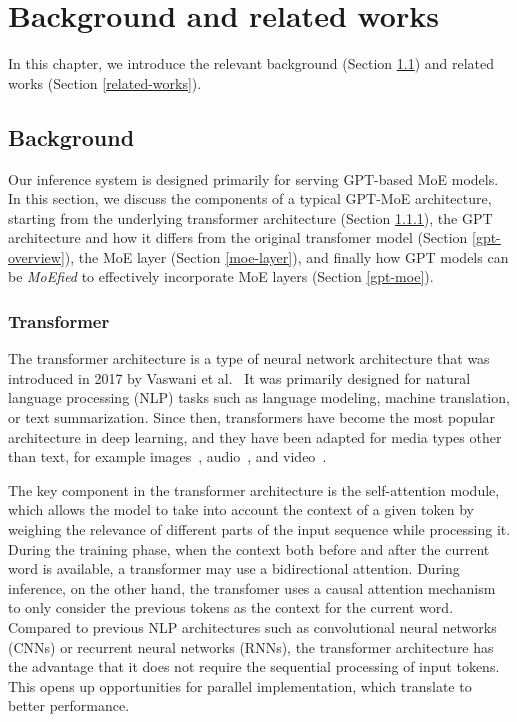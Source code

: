 \chapter{Background and related works}\label{chapter-2}
In this chapter, we introduce the relevant background (Section \ref{background}) and related works (Section \ref{related-works}). 

\section{Background}\label{background}
Our inference system is designed primarily for serving GPT-based MoE models. In this section, we discuss the components of a typical GPT-MoE architecture, starting from the underlying transformer architecture (Section \ref{transformer}), the GPT architecture and how it differs from the original transfomer model (Section \ref{gpt-overview}), the MoE layer (Section \ref{moe-layer}), and finally how GPT models can be \textit{MoEfied} to effectively incorporate MoE layers (Section \ref{gpt-moe}).

\subsection{Transformer}\label{transformer}
The transformer architecture is a type of neural network architecture that was introduced in 2017 by Vaswani et al.~\cite{transformer} It was primarily designed for natural language processing (NLP) tasks such as language modeling, machine translation, or text summarization. Since then, transformers have become the most popular architecture in deep learning, and they have been adapted for media types other than text, for example images~\cite{vit}, audio~\cite{wav2vec}, and video~\cite{vivit}.

The key component in the transformer architecture is the self-attention module, which allows the model to take into account the context of a given token by weighing the relevance of different parts of the input sequence while processing it. During the training phase, when the context both before and after the current word is available, a transformer may use a bidirectional attention. During inference, on the other hand, the transfomer uses a causal attention mechanism to only consider the previous tokens as the context for the current word. Compared to previous NLP architectures such as convolutional neural networks (CNNs) or recurrent neural networks (RNNs), the transformer architecture has the advantage that it does not require the sequential processing of input tokens. This opens up opportunities for parallel implementation, which translate to better performance. 

